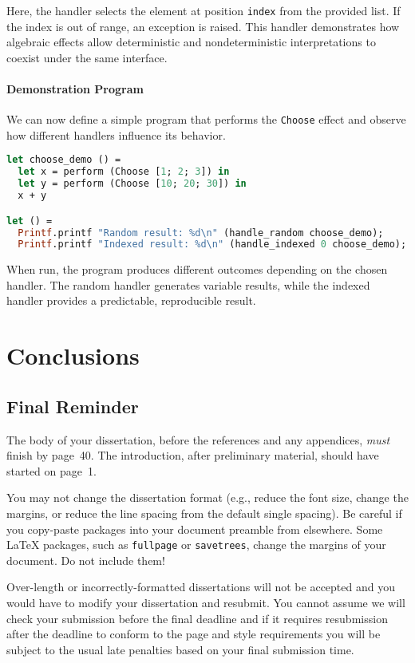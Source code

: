 \documentclass[logo,bsc,singlespacing,parskip,online]{infthesis}
\begin{document}
Here, the handler selects the element at position \texttt{index} from the provided list. If the index is out of range, an exception is raised. This handler demonstrates how algebraic effects allow deterministic and nondeterministic interpretations to coexist under the same interface.

\subsubsection{Demonstration Program}

We can now define a simple program that performs the \texttt{Choose} effect and observe how different handlers influence its behavior.

\begin{lstlisting}[language=OCaml]
let choose_demo () =
  let x = perform (Choose [1; 2; 3]) in
  let y = perform (Choose [10; 20; 30]) in
  x + y

let () =
  Printf.printf "Random result: %d\n" (handle_random choose_demo);
  Printf.printf "Indexed result: %d\n" (handle_indexed 0 choose_demo);
\end{lstlisting}

When run, the program produces different outcomes depending on the chosen handler. The random handler generates variable results, while the indexed handler provides a predictable, reproducible result.

\chapter{Conclusions}

\section{Final Reminder}

The body of your dissertation, before the references and any appendices,
\emph{must} finish by page~40. The introduction, after preliminary material,
should have started on page~1.

You may not change the dissertation format (e.g., reduce the font size, change
the margins, or reduce the line spacing from the default single spacing). Be
careful if you copy-paste packages into your document preamble from elsewhere.
Some \LaTeX{} packages, such as \texttt{fullpage} or \texttt{savetrees}, change
the margins of your document. Do not include them!

Over-length or incorrectly-formatted dissertations will not be accepted and you
would have to modify your dissertation and resubmit. You cannot assume we will
check your submission before the final deadline and if it requires resubmission
after the deadline to conform to the page and style requirements you will be
subject to the usual late penalties based on your final submission time.
\end{document}

